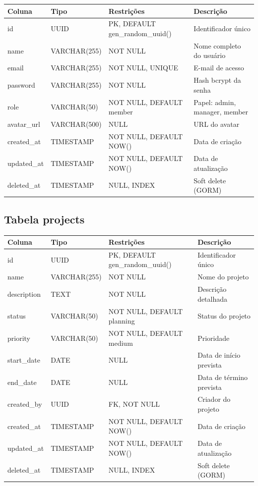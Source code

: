 \documentclass[a4paper,12pt,oneside]{article}
\begin{document}
\begin{table}[H]
\centering
\small
\begin{tabularx}{\textwidth}{l l l X}
\toprule
\textbf{Coluna} & \textbf{Tipo} & \textbf{Restrições} & \textbf{Descrição} \\
\midrule
id & UUID & PK, DEFAULT gen\_random\_uuid() & Identificador único \\
name & VARCHAR(255) & NOT NULL & Nome completo do usuário \\
email & VARCHAR(255) & NOT NULL, UNIQUE & E-mail de acesso \\
password & VARCHAR(255) & NOT NULL & Hash bcrypt da senha \\
role & VARCHAR(50) & NOT NULL, DEFAULT member & Papel: admin, manager, member \\
avatar\_url & VARCHAR(500) & NULL & URL do avatar \\
created\_at & TIMESTAMP & NOT NULL, DEFAULT NOW() & Data de criação \\
updated\_at & TIMESTAMP & NOT NULL, DEFAULT NOW() & Data de atualização \\
deleted\_at & TIMESTAMP & NULL, INDEX & Soft delete (GORM) \\
\bottomrule
\end{tabularx}
\end{table}

\subsection{Tabela projects}

\begin{table}[H]
\centering
\small
\begin{tabularx}{\textwidth}{l l l X}
\toprule
\textbf{Coluna} & \textbf{Tipo} & \textbf{Restrições} & \textbf{Descrição} \\
\midrule
id & UUID & PK, DEFAULT gen\_random\_uuid() & Identificador único \\
name & VARCHAR(255) & NOT NULL & Nome do projeto \\
description & TEXT & NOT NULL & Descrição detalhada \\
status & VARCHAR(50) & NOT NULL, DEFAULT planning & Status do projeto \\
priority & VARCHAR(50) & NOT NULL, DEFAULT medium & Prioridade \\
start\_date & DATE & NULL & Data de início prevista \\
end\_date & DATE & NULL & Data de término prevista \\
created\_by & UUID & FK, NOT NULL & Criador do projeto \\
created\_at & TIMESTAMP & NOT NULL, DEFAULT NOW() & Data de criação \\
updated\_at & TIMESTAMP & NOT NULL, DEFAULT NOW() & Data de atualização \\
deleted\_at & TIMESTAMP & NULL, INDEX & Soft delete (GORM) \\
\bottomrule
\end{tabularx}
\end{table}
\end{document}
